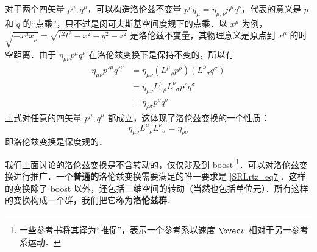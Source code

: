 对于两个四矢量 $p^\mu,q^\mu$，可以构造洛伦兹不变量 $p^\mu q_\mu=\eta_{\mu,\nu}p^\mu q^\nu$，代表的意义是 $p$ 和 $q$ 的“点乘”，只不过是闵可夫斯基空间度规下的点乘．以 $x^\mu$ 为例，$\sqrt{-x^\mu x_\mu}=\sqrt{c^2t^2-x^2-y^2-z^2}$ 是洛伦兹不变量，其物理意义是原点到 $x^\mu$ 的时空距离．由于 $\eta_{\mu\nu}p^\mu q^\nu$ 在洛伦兹变换下是保持不变的，所以有
\begin{equation}
\begin{aligned}
\eta_{\mu\nu}p'^\mu q'^\nu&=\eta_{\mu\nu}({L^\mu}_\rho p^\rho) ({L^\nu}_\sigma q^\sigma)\\
&=\eta_{\mu\nu}{L^\mu}_\rho {L^\nu}_\sigma p^\rho q^\sigma
\\
&=\eta_{\rho\sigma} p^\rho q^\sigma
\end{aligned}
\end{equation}
上式对任意的四矢量 $p^\mu,q^\mu$ 都成立，这体现了洛伦兹变换的一个性质：
\begin{equation}\label{SRLrtz_eq7}
\eta_{\mu\nu}{L^\mu}_\rho {L^\nu}_\sigma=\eta_{\rho\sigma}
\end{equation}
即洛伦兹变换是保度规的．

我们上面讨论的洛伦兹变换是不含转动的，仅仅涉及到 boost \footnote{一些参考书将其译为“推促”，表示一个参考系以速度 $\bvec v$ 相对于另一参考系运动．}．可以对洛伦兹变换进行推广．一个\textbf{普通的}洛伦兹变换需要满足的唯一要求是 \autoref{SRLrtz_eq7}．这样的变换除了 boost 以外，还包括三维空间的转动（当然也包括单位元）．所有这样的变换构成一个群，我们把它称为\textbf{洛伦兹群}．
